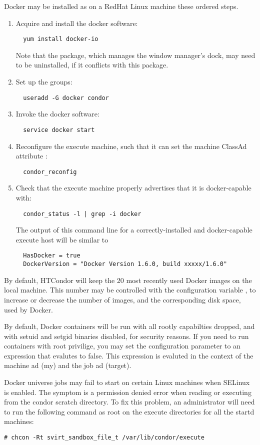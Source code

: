 Docker may be installed as  on a RedHat Linux machine these
ordered steps.
\begin{enumerate}
\item
Acquire and install the docker software:
\begin{verbatim}
  yum install docker-io
\end{verbatim}
Note that the  package,
which manages the window manager's dock,
 may need to be uninstalled,
if it conflicts with this  package.
\item
Set up the groups:
\begin{verbatim}
  useradd -G docker condor
\end{verbatim}
\item
Invoke the docker software:
\begin{verbatim}
  service docker start
\end{verbatim}
\item
Reconfigure the execute machine, such that it can set the machine ClassAd
attribute :
\begin{verbatim}
  condor_reconfig
\end{verbatim}
\item
Check that the execute machine properly advertises that it is docker-capable
with:
\begin{verbatim}
  condor_status -l | grep -i docker
\end{verbatim}
The output of this command line for a correctly-installed and 
docker-capable execute host will be similar to
\begin{verbatim}
  HasDocker = true
  DockerVersion = "Docker Version 1.6.0, build xxxxx/1.6.0"
\end{verbatim}
\end{enumerate}

By default, HTCondor will keep the 20 most recently used Docker images
on the local machine.  This number may be controlled with the configuration
variable , 
to increase or decrease the number
of images, and the corresponding disk space, used by Docker.

By default, Docker containers will be run with all rootly capabilties dropped,
and with setuid and setgid binaries disabled, for security reasons. If  you
need to run containers with root privilige, you may set the configuration
parameter  to an expression that
evalutes to false.  This expression is evaluted in the context of the machine ad (my) and the job ad (target).

Docker universe jobs may fail to start on certain Linux machines when SELinux is enabled.
The symptom is a permission denied error when reading or executing from the condor scratch
directory.  To fix this problem, an administrator will need to run the following command
as root on the execute directories for all the startd machines:

\begin{verbatim}
# chcon -Rt svirt_sandbox_file_t /var/lib/condor/execute 
\end{verbatim}
